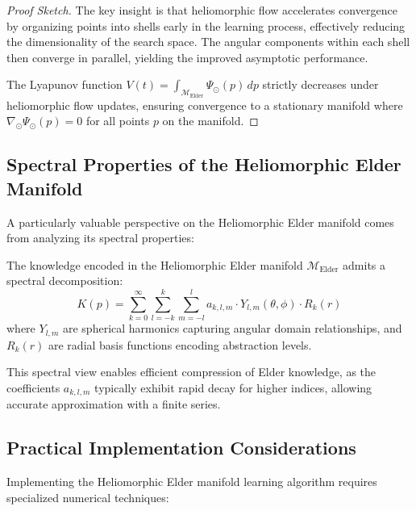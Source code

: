 \begin{proof}[Proof Sketch]
The key insight is that heliomorphic flow accelerates convergence by organizing points into shells early in the learning process, effectively reducing the dimensionality of the search space. The angular components within each shell then converge in parallel, yielding the improved asymptotic performance.

The Lyapunov function $V(t) = \int_{\mathcal{M}_{\text{Elder}}} \Psi_{\odot}(p) \, dp$ strictly decreases under heliomorphic flow updates, ensuring convergence to a stationary manifold where $\nabla_{\odot} \Psi_{\odot}(p) = 0$ for all points $p$ on the manifold.
\end{proof}

\subsection{Spectral Properties of the Heliomorphic Elder Manifold}

A particularly valuable perspective on the Heliomorphic Elder manifold comes from analyzing its spectral properties:

\begin{proposition}
The knowledge encoded in the Heliomorphic Elder manifold $\mathcal{M}_{\text{Elder}}$ admits a spectral decomposition:
\begin{equation}
K(p) = \sum_{k=0}^{\infty} \sum_{l=-k}^k \sum_{m=-l}^l a_{k,l,m} \cdot Y_{l,m}(\theta, \phi) \cdot R_k(r)
\end{equation}
where $Y_{l,m}$ are spherical harmonics capturing angular domain relationships, and $R_k(r)$ are radial basis functions encoding abstraction levels.
\end{proposition}

This spectral view enables efficient compression of Elder knowledge, as the coefficients $a_{k,l,m}$ typically exhibit rapid decay for higher indices, allowing accurate approximation with a finite series.

\subsection{Practical Implementation Considerations}

Implementing the Heliomorphic Elder manifold learning algorithm requires specialized numerical techniques:

